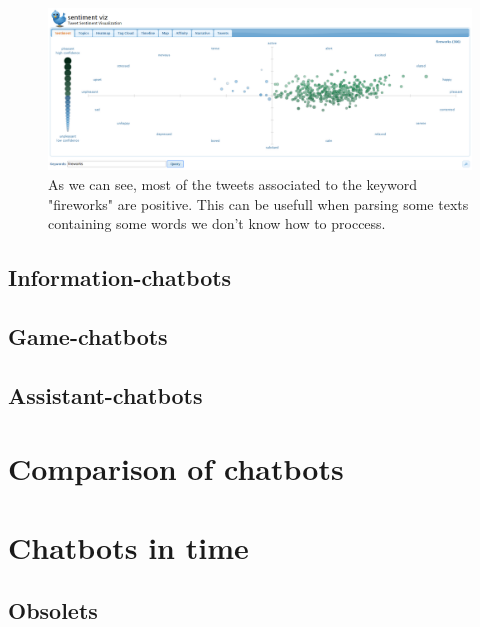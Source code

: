 \documentclass[12pt,twoside]{article}
\theoremstyle{plain}
\theoremstyle{definition}
\theoremstyle{remark}
\begin{document}
		\begin{figure}[H]
			\centering
			\includegraphics[scale=0.35]{./Pictures/fireworks_sentiment_visualization.png}
			\caption{As we can see, most of the tweets associated to the keyword "fireworks" are positive. This can be usefull when parsing some texts containing some words we don't know how to proccess.} 
		\end{figure}
		
	 
		
		
		
	
		
	

	\subsection{Information-chatbots}
	\label{sec:information}

	\subsection{Game-chatbots}
	\label{sec:game}

	\subsection{Assistant-chatbots}
	\label{sec:assistant}
	

\section{Comparison of chatbots}
\label{sec:comparison}


\section{Chatbots in time}
\label{sec:time}

\subsection{Obsolets}
\label{sec:obsolet}
\end{document}
